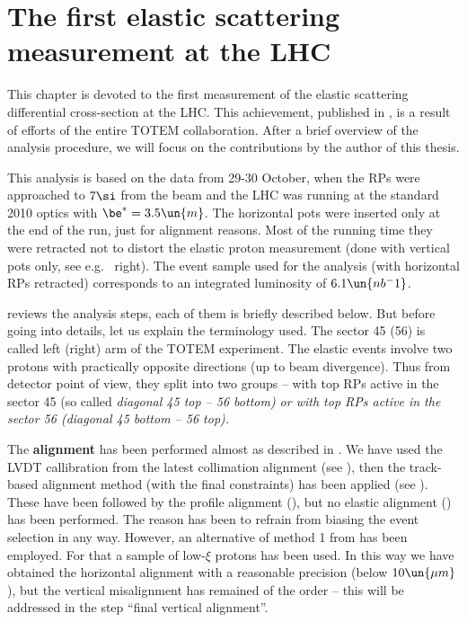 \iffalse
DPE, SD, MC
\fi

\chapter[felm]{The first elastic scattering measurement at the LHC}

This chapter is devoted to the first measurement of the elastic scattering differential cross-section at the LHC. This achievement, published in , is a result of efforts of the entire TOTEM collaboration. After a brief overview of the analysis procedure, we will focus on the contributions by the author of this thesis.

This analysis is based on the data from 29-30 October, when the RPs were approached to $7\si$ from the beam and the LHC was running at the standard 2010 optics with $\be^* = 3.5\un{m}$. The horizontal pots were inserted only at the end of the run, just for alignment reasons. Most of the running time they were retracted not to distort the elastic proton measurement (done with vertical pots only, see e.g.~ right). The event sample used for the analysis (with horizontal RPs retracted) corresponds to an integrated luminosity of $6.1\un{nb^-1}$.



 reviews the analysis steps, each of them is briefly described below. But before going into details, let us explain the terminology used. The sector 45 (56) is called left (right) arm of the TOTEM experiment. The elastic events involve two protons with practically opposite directions (up to beam divergence). Thus from detector point of view, they split into two groups -- with top RPs active in the sector 45 (so called \em{diagonal} 45 top -- 56 bottom) or with top RPs active in the sector 56 (diagonal 45 bottom -- 56 top).

\> The {\bf alignment} has been performed almost as described in . We have used the LVDT callibration from the latest collimation alignment (see ), then the track-based alignment method (with the final constraints) has been applied (see ). These have been followed by the profile alignment (), but no elastic alignment () has  been performed. The reason has been to refrain from biasing the event selection in any way. However, an alternative of method 1 from  has been employed. For that a sample of low-$\xi$ protons has been used. In this way we have obtained the horizontal alignment with a reasonable precision (below $10\un{\mu m}$), but the vertical misalignment has remained of the order  -- this will be addressed in the step ``final vertical alignment''.

